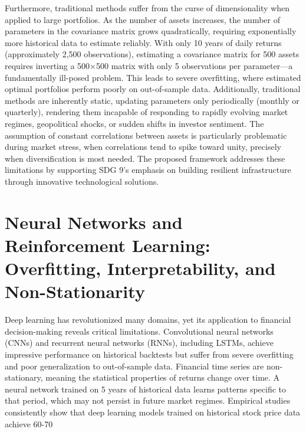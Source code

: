 \documentclass[12pt,a4paper,oneside]{report}
\theoremstyle{definition}
\theoremstyle{remark}
\begin{document}
Furthermore, traditional methods suffer from the curse of dimensionality when applied to large portfolios. As the number of assets increases, the number of parameters in the covariance matrix grows quadratically, requiring exponentially more historical data to estimate reliably. With only 10 years of daily returns (approximately 2,500 observations), estimating a covariance matrix for 500 assets requires inverting a 500×500 matrix with only 5 observations per parameter—a fundamentally ill-posed problem. This leads to severe overfitting, where estimated optimal portfolios perform poorly on out-of-sample data. Additionally, traditional methods are inherently static, updating parameters only periodically (monthly or quarterly), rendering them incapable of responding to rapidly evolving market regimes, geopolitical shocks, or sudden shifts in investor sentiment. The assumption of constant correlations between assets is particularly problematic during market stress, when correlations tend to spike toward unity, precisely when diversification is most needed. The proposed framework addresses these limitations by supporting SDG 9's emphasis on building resilient infrastructure through innovative technological solutions.

\section{Neural Networks and Reinforcement Learning: Overfitting, Interpretability, and Non-Stationarity}

Deep learning has revolutionized many domains, yet its application to financial decision-making reveals critical limitations. Convolutional neural networks (CNNs) and recurrent neural networks (RNNs), including LSTMs, achieve impressive performance on historical backtests but suffer from severe overfitting and poor generalization to out-of-sample data. Financial time series are non-stationary, meaning the statistical properties of returns change over time. A neural network trained on 5 years of historical data learns patterns specific to that period, which may not persist in future market regimes. Empirical studies consistently show that deep learning models trained on historical stock price data achieve 60-70%
\end{document}
